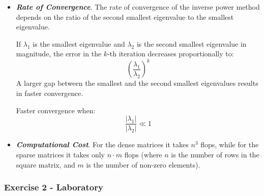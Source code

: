 \begin{enumerate}[label=\textcolor{Green3}{\textbf{\arabic*.}}]
\begin{itemize}
        \item \textbf{\emph{Rate of Convergence}}. The rate of convergence of the inverse power method depends on the ratio of the second smallest eigenvalue to the smallest eigenvalue.
        
        If $\lambda_{1}$ is the smallest eigenvalue and $\lambda_{2}$ is the second smallest eigenvalue in magnitude, the error in the $k$-th iteration decreases proportionally to:
        \begin{equation*}
            \left( \frac{\lambda_{1}}{\lambda_{2}} \right)^{k}
        \end{equation*}
        A larger gap between the smallest and the second smallest eigenvalues results in faster convergence.

        Faster convergence when:
        \begin{equation*}
            \dfrac{\left|\lambda_{1}\right|}{\left|\lambda_{2}\right|} \ll 1
        \end{equation*}

        \item \textbf{\emph{Computational Cost}}. For the dense matrices it takes $n^{3}$ flops, while for the sparse matrices it takes only $n \cdot m$ flops (where $n$ is the number of rows in the square matrix, and $m$ is the number of non-zero elements).
    \end{itemize}
\end{enumerate}


\newpage

\subsubsection*{Exercise 2 - Laboratory}

